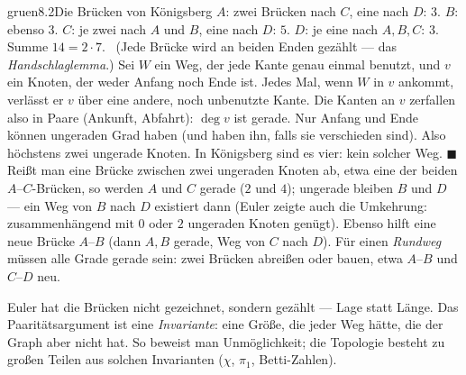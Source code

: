 \begin{loesungkarte}{gruen}{8.2}{Die Brücken von Königsberg}
$A$: zwei Brücken nach $C$, eine nach $D$: $3$. $B$: ebenso $3$. $C$: je zwei nach $A$ und $B$, eine nach $D$: $5$. $D$: je eine nach $A, B, C$: $3$. Summe $14 = 2\cdot7$. \checkmark\ (Jede Brücke wird an beiden Enden gezählt --- das \emph{Handschlaglemma}.)
Sei $W$ ein Weg, der jede Kante genau einmal benutzt, und $v$ ein Knoten, der weder Anfang noch Ende ist. Jedes Mal, wenn $W$ in $v$ ankommt, verlässt er $v$ über eine andere, noch unbenutzte Kante. Die Kanten an $v$ zerfallen also in Paare (Ankunft, Abfahrt): $\deg v$ ist gerade. Nur Anfang und Ende können ungeraden Grad haben (und haben ihn, falls sie verschieden sind). Also höchstens zwei ungerade Knoten. In Königsberg sind es vier: kein solcher Weg. $\blacksquare$
Reißt man eine Brücke zwischen zwei ungeraden Knoten ab, etwa eine der beiden $A$--$C$-Brücken, so werden $A$ und $C$ gerade ($2$ und $4$); ungerade bleiben $B$ und $D$ --- ein Weg von $B$ nach $D$ existiert dann (Euler zeigte auch die Umkehrung: zusammenhängend mit $0$ oder $2$ ungeraden Knoten genügt). Ebenso hilft eine neue Brücke $A$--$B$ (dann $A, B$ gerade, Weg von $C$ nach $D$). Für einen \emph{Rundweg} müssen alle Grade gerade sein: zwei Brücken abreißen oder bauen, etwa $A$--$B$ und $C$--$D$ neu.
\begin{mitnehmen}\kastentext
Euler hat die Brücken nicht gezeichnet, sondern gezählt --- Lage statt Länge. Das Paaritätsargument ist eine \emph{Invariante}: eine Größe, die jeder Weg hätte, die der Graph aber nicht hat. So beweist man Unmöglichkeit; die Topologie besteht zu großen Teilen aus solchen Invarianten ($\chi$, $\pi_1$, Betti-Zahlen).
\end{mitnehmen}
\end{loesungkarte}

